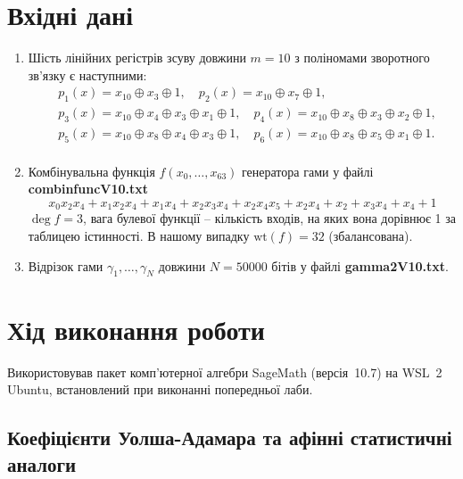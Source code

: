 \section{Вхідні дані}
\begin{enumerate}
    \item Шість лінійних регістрів зсуву довжини $m = 10$ з поліномами зворотного зв’язку є наступними:
        \begin{align*}
                & p_{1}(x) = x_{10} \oplus x_{3} \oplus 1, \quad p_{2}(x) = x_{10} \oplus x_{7} \oplus 1,                                                     \\
                & p_{3}(x) = x_{10} \oplus x_{4} \oplus x_{3} \oplus x_{1} \oplus 1, \quad p_{4}(x) = x_{10} \oplus x_{8} \oplus x_{3} \oplus x_{2} \oplus 1, \\
                & p_{5}(x) = x_{10} \oplus x_{8} \oplus x_{4} \oplus x_{3} \oplus 1, \quad p_{6}(x) = x_{10} \oplus x_{8} \oplus x_{5} \oplus x_{1} \oplus 1. \\
        \end{align*}
    \item Комбінувальна функція $f(x_{0}, \ldots, x_{63})$ генератора гами у файлі \textbf{combinfuncV10.txt}
        \begin{equation*}
            x_{0} x_{2} x_{4} + x_{1} x_{2} x_{4} + x_{1} x_{4} + x_{2} x_{3} x_{4} + x_{2} x_{4} x_{5} + x_{2} x_{4} + x_{2} + x_{3} x_{4} + x_{4} + 1
        \end{equation*}
        $\deg f = 3$, вага булевої функції -- кількість входів, на яких вона дорівнює 1 за таблицею істинності. 
        В нашому випадку $\mathrm{wt}(f) = 32$ (збалансована).
    \item Відрізок гами $\gamma_{1}, \ldots, \gamma_{N}$ довжини $N = 50000$ бітів у файлі \textbf{gamma2V10.txt}.

\end{enumerate}

\section{Хід виконання роботи}

Використовував пакет комп'ютерної алгебри SageMath (версія~10.7) на WSL~2 Ubuntu, встановлений при виконанні
попередньої лаби.

\subsection{Коефіцієнти Уолша-Адамара та афінні статистичні аналоги}

